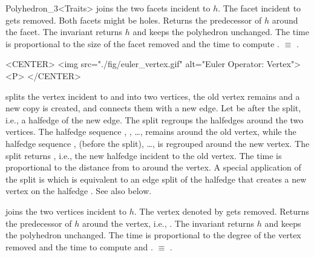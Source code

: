 \begin{ccRefClass}{Polyhedron_3<Traits>}
    {joins the two facets incident to $h$. The facet incident to
       gets removed. Both facets might be
    holes. Returns the predecessor of $h$ around the facet. The invariant
     returns $h$ and keeps
    the polyhedron unchanged. The time is proportional to the size of the
    facet removed and the time to compute .
      $\equiv$
    .}

\begin{ccHtmlOnly}
    <CENTER>
    <img src="./fig/euler_vertex.gif" alt="Euler Operator: Vertex"><P>
    </CENTER>
\end{ccHtmlOnly}

    {splits the vertex incident to  and  into two vertices,
    the old vertex remains and a new copy is created,
    and connects them with a new edge. Let  be
     after the split, i.e., a halfedge
    of the new edge. The split regroups the halfedges around the two
    vertices. The halfedge sequence , ,
    \ldots,  remains around the old vertex, while the
    halfedge sequence , 
    (before the split), \ldots,  is regrouped around the new
    vertex. The split returns , i.e., the new halfedge incident
    to the old vertex. The time is proportional to the distance from
     to  around the vertex.
     A special application of the split is
     which is equivalent to an
    edge split of the halfedge  that creates a new
    vertex on the halfedge . See also 
    below.}

    {joins the two vertices incident to $h$. The vertex denoted by
       gets removed. Returns the predecessor of
    $h$ around the vertex, i.e., .
    The invariant  returns
    $h$ and keeps the polyhedron unchanged.
    The time is proportional to the degree of the vertex removed and
    the time to compute  and .
      $\equiv$
    .}


\end{ccRefClass}
